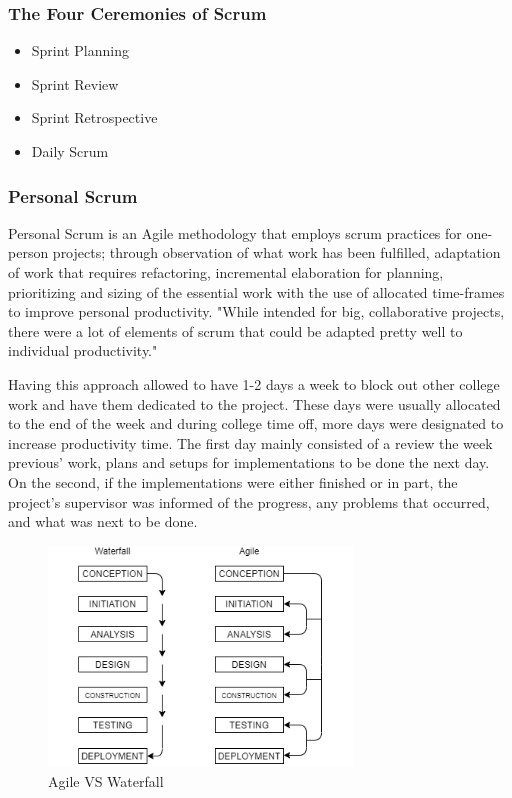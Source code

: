 \subsubsection{The Four Ceremonies of Scrum}
\begin{itemize}
    \item Sprint Planning
    \item Sprint Review
    \item Sprint Retrospective
    \item Daily Scrum
\end{itemize}\cite{ref3}

\subsubsection{Personal Scrum}
Personal Scrum is an Agile methodology that employs scrum practices for one-person projects; through observation of what work has been fulfilled, adaptation of work that requires refactoring, incremental elaboration for planning, prioritizing and sizing of the essential work with the use of allocated time-frames to improve personal productivity.
"While intended for big, collaborative projects, there were a lot of elements of scrum that could be adapted pretty well to individual productivity." \cite{ref4}
 
Having this approach allowed to have 1-2 days a week to block out other college work and have them dedicated to the project. These days were usually allocated to the end of the week and during college time off, more days were designated to increase productivity time. The first day mainly consisted of a review the week previous' work, plans and setups for implementations to be done the next day. On the second, if the implementations were either finished or in part, the project's supervisor was informed of the progress, any problems that occurred, and what was next to be done.

\begin{figure}[H]
    \caption{Agile VS Waterfall}
    \label{image:agileVSwaterfall}
    \centering
    \includegraphics[width=0.72\textwidth]{images/misc/agile-vs-waterfall.png}
\end{figure}

